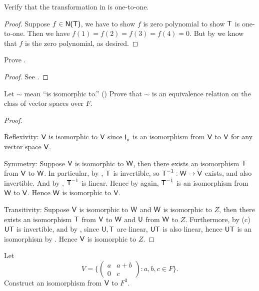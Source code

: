 \begin{exercise} \label{exercise 2.4.11}
Verify that the transformation in  is one-to-one.
\end{exercise}

\begin{proof}
Suppose \(f \in \textsf{N(T)}\), we have to show \(f\) is zero polynomial to show \(\textsf{T}\) is one-to-one.
Then we have \(f(1) = f(2) = f(3) = f(4) = 0\).
But by  we know that \(f\) is the zero polynomial, as desired.
\end{proof}

\begin{exercise} \label{exercise 2.4.12}
Prove .
\end{exercise}

\begin{proof}
See .
\end{proof}

\begin{exercise} \label{exercise 2.4.13}
Let \(\sim\) mean ``is isomorphic to.'' ()
Prove that \(\sim\) is an equivalence relation on the class of vector spaces over \(F\).
\end{exercise}

\begin{proof}\ 

Reflexivity: \(\textsf{V}\) is isomorphic to \(\textsf{V}\) since \(\textsf{I}_{_{\textsf{V}}}\) is an isomorphism from \(\textsf{V}\) to \(\textsf{V}\) for any vector space \(\textsf{V}\).

Symmetry: Suppose \(\textsf{V}\) is isomorphic to \(\textsf{W}\), then there exists an isomorphism \(\textsf{T}\) from \(\textsf{V}\) to \(\textsf{W}\).
In particular, by , \(\textsf{T}\) is invertible, so \(\textsf{T}^{-1} : \textsf{W} \to \textsf{V}\) exists, and also invertible.
And by , \(\textsf{T}^{-1}\) is linear.
Hence by  again, \(\textsf{T}^{-1}\) is an isomorphism from \(\textsf{W}\) to \(\textsf{V}\).
Hence \(\textsf{W}\) is isomorphic to \(\textsf{V}\).

Transitivity: Suppose \(\textsf{V}\) is isomorphic to \(\textsf{W}\) and \(\textsf{W}\) is isomorphic to \(Z\), then there exists an isomorphism \(\textsf{T}\) from \(\textsf{V}\) to \(\textsf{W}\) and \(\textsf{U}\) from \(\textsf{W}\) to \(Z\).
Furthermore, by (c) \(\textsf{U}\textsf{T}\) is invertible, and by , since \(\textsf{U}, \textsf{T}\) are linear, \(\textsf{U}\textsf{T}\) is also linear, hence \(\textsf{U}\textsf{T}\) is an isomorphism by .
Hence \(\textsf{V}\) is isomorphic to \(Z\).
\end{proof}

\begin{exercise} \label{exercise 2.4.14}
Let
\[
    V = \bigg\{ \begin{pmatrix} a & a + b \\ 0 & c \end{pmatrix} : a, b, c \in F \bigg\}.
\]
Construct an isomorphism from \(\textsf{V}\) to \(F^3\).
\end{exercise}

